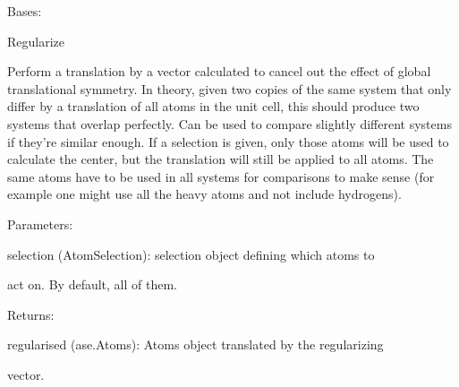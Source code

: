 \documentclass[letterpaper,10pt,english]{sphinxmanual}
\begin{document}

\begin{fulllineitems}
\label{doctree/soprano.properties.transform.transform:soprano.properties.transform.transform.Regularise}
Bases: {\hyperref[doctree/soprano.properties.atomsproperty:soprano.properties.atomsproperty.AtomsProperty]{\emph{}}}

Regularize

Perform a translation by a vector calculated to cancel out the effect of
global translational symmetry. In theory, given two copies of the same
system that only differ by a translation of all atoms in the unit cell,
this should produce two systems that overlap perfectly. Can be used to
compare slightly different systems if they're similar enough. If a
selection is given, only those atoms will be used to calculate the center,
but the translation will still be applied to all atoms. The same atoms
have to be used in all systems for comparisons to make sense (for example
one might use all the heavy atoms and not include hydrogens).

\begin{DUlineblock}{0em}
\item[] Parameters:
\item[]
\begin{DUlineblock}{\DUlineblockindent}
\item[] selection (AtomSelection): selection object defining which atoms to
\item[]
\begin{DUlineblock}{\DUlineblockindent}
\item[] act on. By default, all of them.
\end{DUlineblock}
\end{DUlineblock}
\end{DUlineblock}

\begin{DUlineblock}{0em}
\item[] Returns:
\item[]
\begin{DUlineblock}{\DUlineblockindent}
\item[] regularised (ase.Atoms): Atoms object translated by the regularizing
\item[]
\begin{DUlineblock}{\DUlineblockindent}
\item[] vector.
\end{DUlineblock}
\end{DUlineblock}
\end{DUlineblock}


\end{fulllineitems}
\end{document}
